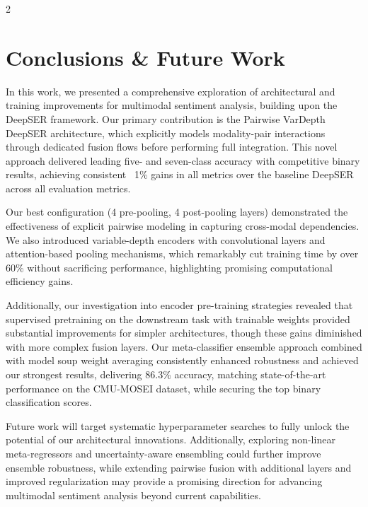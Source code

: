 \documentclass[10pt]{article}
\begin{document}
\begin{multicols}{2}
\section{Conclusions \& Future Work}
\par In this work, we presented a comprehensive exploration of architectural and training improvements for multimodal sentiment analysis, building upon the DeepSER framework. Our primary contribution is the Pairwise VarDepth DeepSER architecture, which explicitly models modality-pair interactions through dedicated fusion flows before performing full integration. This novel approach delivered leading five- and seven-class accuracy with competitive binary results, achieving consistent ~1\% gains in all metrics over the baseline DeepSER across all evaluation metrics. 
\par Our best configuration (4 pre-pooling, 4 post-pooling layers) demonstrated the effectiveness of explicit pairwise modeling in capturing cross-modal dependencies. We also introduced variable-depth encoders with convolutional layers and attention-based pooling mechanisms, which remarkably cut training time by over 60\% without sacrificing performance, highlighting promising computational efficiency gains. 
\par Additionally, our investigation into encoder pre-training strategies revealed that supervised pretraining on the downstream task with trainable weights provided substantial improvements for simpler architectures, though these gains diminished with more complex fusion layers. Our meta-classifier ensemble approach combined with model soup weight averaging consistently enhanced robustness and achieved our strongest results, delivering 86.3\% accuracy, matching state-of-the-art performance on the CMU-MOSEI dataset, while securing the top binary classification scores. 
\par Future work will target systematic hyperparameter searches to fully unlock the potential of our architectural innovations. Additionally, exploring non-linear meta-regressors and uncertainty-aware ensembling could further improve ensemble robustness, while extending pairwise fusion with additional layers and improved regularization may provide a promising direction for advancing multimodal sentiment analysis beyond current capabilities.

\printbibliography

\end{multicols}
\end{document}
